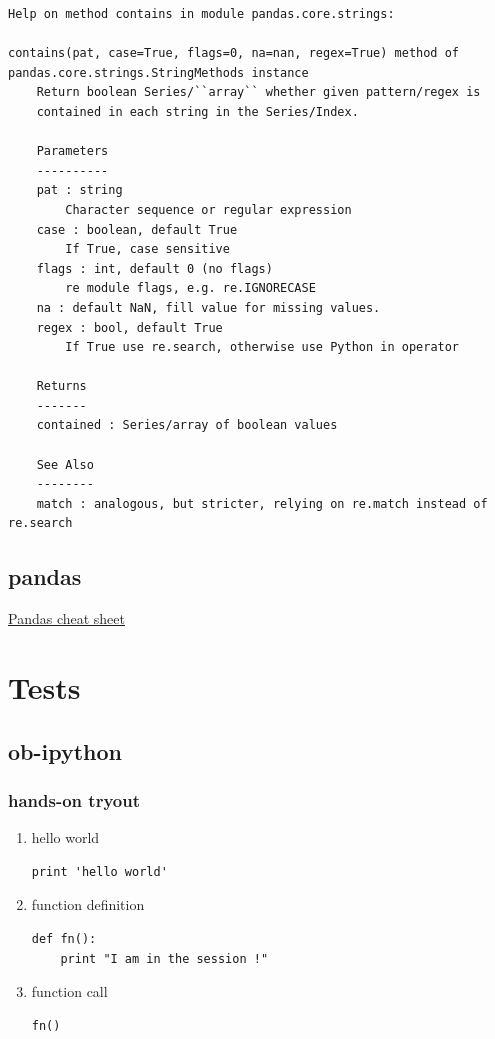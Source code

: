 \documentclass[11pt]{article}
\begin{document}
\begin{verbatim}
Help on method contains in module pandas.core.strings:

contains(pat, case=True, flags=0, na=nan, regex=True) method of pandas.core.strings.StringMethods instance
    Return boolean Series/``array`` whether given pattern/regex is
    contained in each string in the Series/Index.
    
    Parameters
    ----------
    pat : string
        Character sequence or regular expression
    case : boolean, default True
        If True, case sensitive
    flags : int, default 0 (no flags)
        re module flags, e.g. re.IGNORECASE
    na : default NaN, fill value for missing values.
    regex : bool, default True
        If True use re.search, otherwise use Python in operator
    
    Returns
    -------
    contained : Series/array of boolean values
    
    See Also
    --------
    match : analogous, but stricter, relying on re.match instead of re.search
\end{verbatim}

\subsection{pandas}
\label{sec:org73492d4}
\href{file:///home/teddd/Cours/Data/cheat-sheets/Pandas\_Cheat\_Sheet.pdf}{Pandas cheat sheet}
\section{Tests}
\label{sec:org4002d3d}
\subsection{ob-ipython}
\label{sec:org2648e13}
\subsubsection{hands-on tryout}
\label{sec:org3bbdee7}
\begin{enumerate}
\item hello world
\label{sec:orgbe0ba0a}
\begin{verbatim}
print 'hello world'
\end{verbatim}
\item function definition
\label{sec:orgcce2ad6}
\begin{verbatim}
def fn():
    print "I am in the session !"
\end{verbatim}

\item function call
\label{sec:org70ee472}
\begin{verbatim}
fn()
\end{verbatim}
\end{enumerate}
\end{document}
